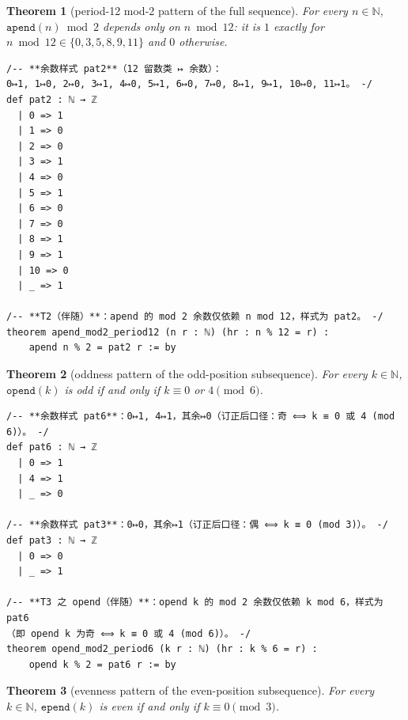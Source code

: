 \documentclass[11pt]{article}
\newtheorem{theorem}{Theorem}
\theoremstyle{definition}
\begin{document}
\begin{theorem}[period-12 mod-2 pattern of the full sequence]\label{thm:t2}
For every $n\in\mathbb{N}$, $\mathtt{apend}(n)\bmod 2$ depends only on
$n\bmod 12$: it is $1$ exactly for $n\bmod 12\in\{0,3,5,8,9,11\}$ and $0$
otherwise.
\end{theorem}

\begin{lstlisting}[caption={Frozen formal statement, verbatim lines 71--89 of
\texttt{formalized/01-pend-statements.lean}: the pattern \texttt{pat2} and
Theorem~\ref{thm:t2}.},label={lst:s2}]
/-- **余数样式 pat2**（12 留数类 ↦ 余数）：
0↦1, 1↦0, 2↦0, 3↦1, 4↦0, 5↦1, 6↦0, 7↦0, 8↦1, 9↦1, 10↦0, 11↦1。 -/
def pat2 : ℕ → ℤ
  | 0 => 1
  | 1 => 0
  | 2 => 0
  | 3 => 1
  | 4 => 0
  | 5 => 1
  | 6 => 0
  | 7 => 0
  | 8 => 1
  | 9 => 1
  | 10 => 0
  | _ => 1

/-- **T2（伴随）**：apend 的 mod 2 余数仅依赖 n mod 12，样式为 pat2。 -/
theorem apend_mod2_period12 (n r : ℕ) (hr : n % 12 = r) :
    apend n % 2 = pat2 r := by
\end{lstlisting}

\begin{theorem}[oddness pattern of the odd-position subsequence]\label{thm:t3o}
For every $k\in\mathbb{N}$, $\mathtt{opend}(k)$ is odd if and only if
$k\equiv 0$ or $4\pmod 6$.
\end{theorem}

\begin{lstlisting}[caption={Frozen formal statements, verbatim lines 92--106 of
\texttt{formalized/01-pend-statements.lean}: the patterns \texttt{pat6} and
\texttt{pat3} and Theorem~\ref{thm:t3o}.},label={lst:s3}]
/-- **余数样式 pat6**：0↦1, 4↦1，其余↦0（订正后口径：奇 ⟺ k ≡ 0 或 4 (mod 6)）。 -/
def pat6 : ℕ → ℤ
  | 0 => 1
  | 4 => 1
  | _ => 0

/-- **余数样式 pat3**：0↦0，其余↦1（订正后口径：偶 ⟺ k ≡ 0 (mod 3)）。 -/
def pat3 : ℕ → ℤ
  | 0 => 0
  | _ => 1

/-- **T3 之 opend（伴随）**：opend k 的 mod 2 余数仅依赖 k mod 6，样式为 pat6
（即 opend k 为奇 ⟺ k ≡ 0 或 4 (mod 6)）。 -/
theorem opend_mod2_period6 (k r : ℕ) (hr : k % 6 = r) :
    opend k % 2 = pat6 r := by
\end{lstlisting}

\begin{theorem}[evenness pattern of the even-position subsequence]\label{thm:t3e}
For every $k\in\mathbb{N}$, $\mathtt{epend}(k)$ is even if and only if
$k\equiv 0\pmod 3$.
\end{theorem}
\end{document}
